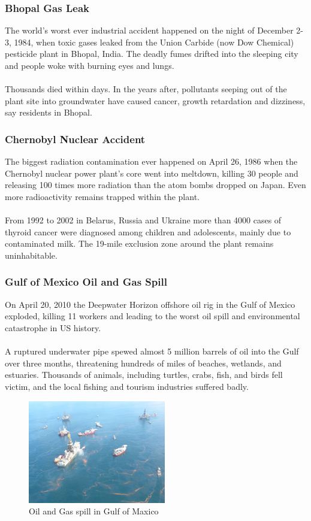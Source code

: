 \subsubsection{Bhopal Gas Leak}
The world’s worst ever industrial accident happened on the night of December 2-3, 1984, when toxic gases leaked from the Union Carbide (now Dow Chemical) pesticide plant in Bhopal, India. The deadly fumes drifted into the sleeping city and people woke with burning eyes and lungs.
\\
\\
Thousands died within days. In the years after, pollutants seeping out of the plant site into groundwater have caused cancer, growth retardation and dizziness, say residents in Bhopal.\cite{9}

\subsubsection{Chernobyl Nuclear Accident}
The biggest radiation contamination ever happened on April 26, 1986 when the Chernobyl nuclear power plant’s core went into meltdown, killing 30 people and releasing 100 times more radiation than the atom bombs dropped on Japan. Even more radioactivity remains trapped within the plant.
\\
\\
From 1992 to 2002 in Belarus, Russia and Ukraine more than 4000 cases of thyroid cancer were diagnosed among children and adolescents, mainly due to contaminated milk. The 19-mile exclusion zone around the plant remains uninhabitable.\cite{9}

\subsubsection{Gulf of Mexico Oil and Gas Spill}
On April 20, 2010 the Deepwater Horizon offshore oil rig in the Gulf of Mexico exploded, killing 11 workers and leading to the worst oil spill and environmental catastrophe in US history.
\\
\\
A ruptured underwater pipe spewed almost 5 million barrels of oil into the Gulf over three months, threatening hundreds of miles of beaches, wetlands, and estuaries. Thousands of animals, including turtles, crabs, fish, and birds fell victim, and the local fishing and tourism industries suffered badly.\cite{9}
\begin{figure}[h]
\centering
  \includegraphics[width=60mm]{dwh-oil-spill-view-over-rig.jpg}
  \caption{Oil and Gas spill in Gulf of Maxico \cite{28}}
  \label{fig:Noise Pollution}
\end{figure}

